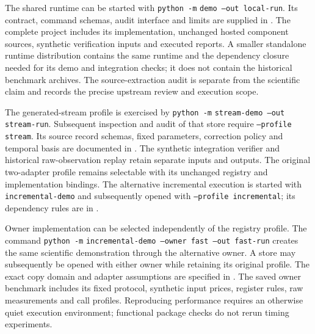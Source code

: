 \documentclass[11pt,a4paper]{article}
\theoremstyle{definition}\newtheorem{definition}[theorem]{Definition}
\begin{document}
The shared runtime can be started with \texttt{python -m}  \texttt{demo --out local-run}. Its contract, command schemas, audit interface and limits are supplied in . The complete project includes its implementation, unchanged hosted component sources, synthetic verification inputs and executed reports. A smaller standalone runtime distribution contains the same runtime and the dependency closure needed for its demo and integration checks; it does not contain the historical benchmark archives. The source-extraction audit is separate from the scientific claim and records the precise upstream review and execution scope.

The generated-stream profile is exercised by \texttt{python -m}  \texttt{stream-demo --out stream-run}. Subsequent inspection and audit of that store require \texttt{--profile stream}. Its source record schemas, fixed parameters, correction policy and temporal basis are documented in . The synthetic integration verifier and historical raw-observation replay retain separate inputs and outputs. The original two-adapter profile remains selectable with its unchanged registry and implementation bindings. The alternative incremental execution is started with \texttt{incremental-demo} and subsequently opened with \texttt{--profile incremental}; its dependency rules are in .

Owner implementation can be selected independently of the registry profile. The command \texttt{python -m}  \texttt{incremental-demo --owner fast --out fast-run} creates the same scientific demonstration through the alternative owner. A store may subsequently be opened with either owner while retaining its original profile. The exact copy domain and adapter assumptions are specified in . The saved owner benchmark includes its fixed protocol, synthetic input prices, register rules, raw measurements and call profiles. Reproducing performance requires an otherwise quiet execution environment; functional package checks do not rerun timing experiments.
\end{document}
